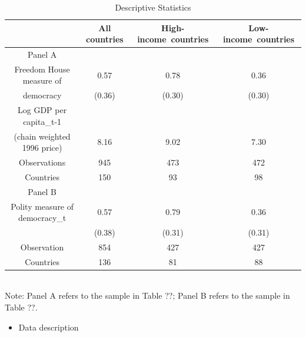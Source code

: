 \documentclass[a4paper,11pt]{article}
\begin{document}
\newpage
{}
\listoftables
\begin{table}[hbtp]
  \caption{Descriptive Statistics}
  \label{table:data_type}
  \small
  \centering
  \begin{tabular}{cccc}
    \hline
      & All countries  &  High-income\ countries & Low-income\ countries \\
    \hline \hline
    Panel A  &   &  & \\
    Freedom House measure of   & 0.57   & 0.78 & 0.36\\
    democracy & (0.36) & (0.30) & (0.30) \\
    Log GDP per capita_{t-1} \\(chain  weighted  1996  price)  & 8.16  & 9.02 & 7.30 \\
    Observations  &  945  &  473 & 472 \\
    Countries  &  150  &  93 & 98 \\
    \hline
    Panel B &  & & \\
    Polity measure of democracy_t & 0.57 & 0.79 &0.36 \\
      & (0.38) & (0.31) & (0.31) \\
    Observation & 854 & 427 & 427 \\
    Countries & 136 & 81 & 88 \\
    \hline
  
  \end{tabular}
\end{table}\\
Note: Panel A refers to the sample in Table ??; Panel B refers to the sample in Table ??. 


\newpage
\pagestyle{plain}
\setcounter{page}{1}    %




\newpage

\begin{itemize}
 \item Data description
\end{itemize}

\\

\\
\end{document}
